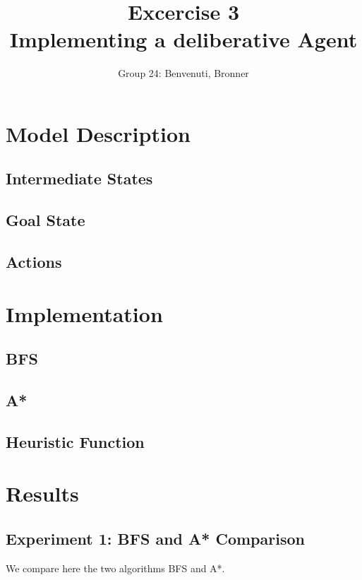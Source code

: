 \documentclass[11pt]{article}
\title{\bf Excercise 3\\ Implementing a deliberative Agent}
\author{Group 24: Benvenuti, Bronner}
\begin{document}
\maketitle

\section{Model Description}

\subsection{Intermediate States}

\subsection{Goal State}

\subsection{Actions}


\section{Implementation}

\subsection{BFS}

\subsection{A*}

\subsection{Heuristic Function}


\section{Results}

\subsection{Experiment 1: BFS and A* Comparison}
We compare here the two algorithms BFS and A*. 
\end{document}
